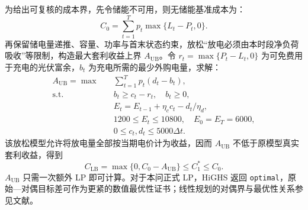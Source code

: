 为给出可复核的成本界，先令储能不可用，则无储能基准成本为：
\begin{equation}C_0=\sum_{t=1}^{T}p_t\max\{L_t-P_t,0\}.\label{eq:q1-baseline}\end{equation}
再保留储电量递推、容量、功率与首末状态约束，放松“放电必须由本时段净负荷吸收”等限制，构造最大套利收益上界 $A_{\mathrm{UB}}$。令 $r_t=\max\{P_t-L_t,0\}$ 为可免费用于充电的光伏富余，$b_t$ 为充电所需的最少外购电量，求解：
\begin{equation}
\begin{aligned}
A_{\mathrm{UB}}=\max\quad&\sum_{t=1}^{T}p_t(d_t-b_t),\\
\text{s.t.}\quad&b_t\ge c_t-r_t,\quad b_t\ge0,\\
&E_t=E_{t-1}+\eta_c c_t-d_t/\eta_d,\\
&1200\le E_t\le10800,\quad E_0=E_T=6000,\\
&0\le c_t,d_t\le5000\Delta t.
\end{aligned}\label{eq:q1-arbitrage}
\end{equation}
该放松模型允许将放电量全部按当期电价计为收益，因而 $A_{\mathrm{UB}}$ 不低于原模型真实套利收益，得到
\begin{equation}C_{\mathrm{LB}}=\max\{0,C_0-A_{\mathrm{UB}}\}\le C_1^*\le C_0.\label{eq:q1-lowerbound}\end{equation}
$A_{\mathrm{UB}}$ 只需一次额外 LP 即可计算。对于本问正式 LP，HiGHS 返回 \texttt{optimal}，原始—对偶目标差可作为更紧的数值最优性证书；线性规划的对偶界与最优性关系参见文献\cite{boyd}。

